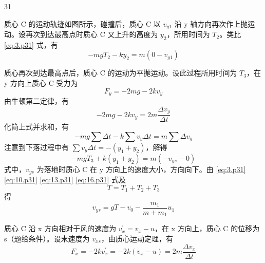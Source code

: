 \begin{solution}{31}
\begin{subsolution}
\begin{subproblem}
      质心 C 的运动轨迹如图所示，碰撞后，质心 C 以 $v_{y1}$ 沿 y 轴方向再次作上抛运动。设再次到达最高点时质心 C 又上升的高度为 $y_{2}$，所用时间为 $T_{2}$。类比 \eqref{eq:3.p31} 式，有
      \begin{equation}
        - m g T_{2} - k y_{2} = m (0 - v_{y 1})
        \label{eq:13.p31}
      \end{equation}
    \end{subproblem}
    \begin{subproblem}
      质心再次到达最高点后，质心 C 的运动为平抛运动。设此过程所用时间为 $T_{3}$，在 y 方向上质心 C 受力为
      \begin{equation}
        F_{y} = - 2 m g - 2 k v_{y}
        \label{eq:14.p31}
      \end{equation}
      由牛顿第二定律，有
      \begin{equation}
        - 2 m g - 2 k v_{y} = 2 m \frac{\Delta v_{y}}{\Delta t}
        \label{eq:15.p31}
      \end{equation}
      化简上式并求和，有
      \begin{equation}
        - m g \sum \Delta t - k \sum v_{y} \Delta t = m \sum \Delta v_{y}
      \end{equation}
      注意到下落过程中有 $\sum v_{y}\Delta t = -(y_{1} + y_{2})$，解得
      \begin{equation}
        - m g T_{3} + k (y_{1} + y_{2}) = m (- v_{y s} - 0)
        \label{eq:16.p31}
      \end{equation}
      式中，$v_{ys}$ 为落地时质心 C 在 y 方向上的速度大小，方向向下。由 \eqref{eq:3.p31} \eqref{eq:10.p31} \eqref{eq:13.p31} \eqref{eq:16.p31} 式及
      \begin{equation}
        T = T_{1} + T_{2} + T_{3}
      \end{equation}
      得
      \begin{equation}
        v_{y s} = g T - v_{0} - \frac{m_{1}}{m + m_{1}} u_{1}
        \label{eq:17.p31}
      \end{equation}
    \end{subproblem}
    \begin{subproblem}
      质心 C 沿 x 方向相对于风的速度为 $v_{x}^{\prime}=v_{x}-u$，在 x 方向上，质心 C 的位移为 s（题给条件）。设末速度为 $v_{xs}$，由质心运动定理，有
      \begin{equation}
        F_{x} = - 2 k v_{x}^{\prime} = - 2 k (v_{x} - u) = 2 m \frac{\Delta v_{x}}{\Delta t}
        \label{eq:18.p31}
      \end{equation}

\end{subproblem}
\end{subsolution}
\end{solution}
